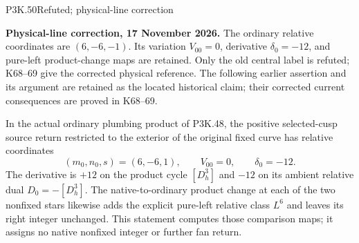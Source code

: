 \begin{statement}{P3K.50}{Refuted; physical-line correction}\par\noindent\textbf{Physical-line correction, 17 November 2026.} The ordinary relative coordinates are \((6,-6,-1)\). Its variation \(V_{00}=0\), derivative \(\delta_0=-12\), and pure-left product-change maps are retained. Only the old central label is refuted; K68--69 give the corrected physical reference. The following earlier assertion and its argument are retained as the located historical claim; their corrected current consequences are proved in K68--69.\medskip\par 
In the actual ordinary plumbing product of P3K.48, the positive
selected-cusp source return restricted to the exterior of the
original fixed curve has relative coordinates
\[
 (m_0,n_0,s)=(6,-6,1),\qquad V_{00}=0,\qquad\delta_0=-12.
\]
The derivative is \(+12\) on the product cycle \([D^3_h]\) and
\(-12\) on its ambient relative dual \(D_0=-[D^3_h]\).
The native-to-ordinary product change at each of the two nonfixed
stars likewise adds the explicit pure-left relative class \(L^6\)
and leaves its right integer unchanged. This statement computes
those comparison maps; it assigns no native nonfixed integer or
further fan return.
\end{statement}
